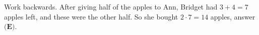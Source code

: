 Work backwards. After giving half of the apples to Ann, Bridget had $3+4=7$ apples left, and these were the other half. So she bought $2\cdot7=14$ apples, answer $\boxed{\textbf{(E)}}$.
